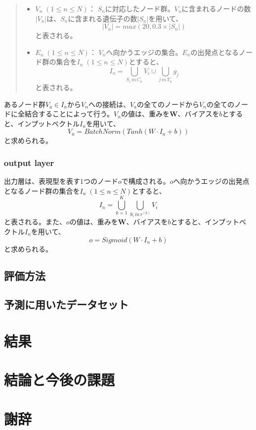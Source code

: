 \documentclass[a4paper,12pt]{jsreport}
\begin{document}
  \begin{quote}
  \begin{itemize}
  \item $V_n \; (1\leq n\leq N)$： $S_n$に対応したノード群。$V_n$に含まれるノードの数$|V_n|$は、$S_n$に含まれる遺伝子の数$|S_n|$を用いて、$$|V_n| = max(20, 0.3 \times |S_n|)$$と表される。
  \item $E_n \; (1\leq n\leq N)$： $V_n$へ向かうエッジの集合。$E_n$の出発点となるノード群の集合を$I_n \; (1\leq n\leq N)$とすると、$$I_n =  \bigcup_{S_i\, in\, C_n}V_i \cup \bigcup_{j\, in\, T_n} g_j$$と表される。
  \end{itemize}
  \end{quote}
  
 あるノード群$V_a \in I_n$から$V_n$への接続は、$V_a$の全てのノードから$V_n$の全てのノードに全結合することによって行う。$V_n$の値は、重みを$\bm{W}$、バイアスを$b$とすると、インプットベクトル$I_n$を用いて、$$V_n = BatchNorm(Tanh(W \cdot I_n + b))$$と求められる。\\
 
\subsection{output layer}
出力層は、表現型を表す1つのノード$o$で構成される。$o$へ向かうエッジの出発点となるノード群の集合を$I_n \; (1\leq n\leq N)$とすると、$$I_n =  \bigcup_{k = 1}^{K}  \bigcup_{S_i\, in\, r^{(k)}}V_i$$と表される。また、$o$の値は、重みを$\bm{W}$、バイアスを$b$とすると、インプットベクトル$I_n$を用いて、$$o = Sigmoid(W \cdot I_n + b)$$と求められる。\\


  
 


\section{評価方法}
\section{予測に用いたデータセット}

\chapter{結果}

\chapter{結論と今後の課題}

\chapter{謝辞}
\end{document}
